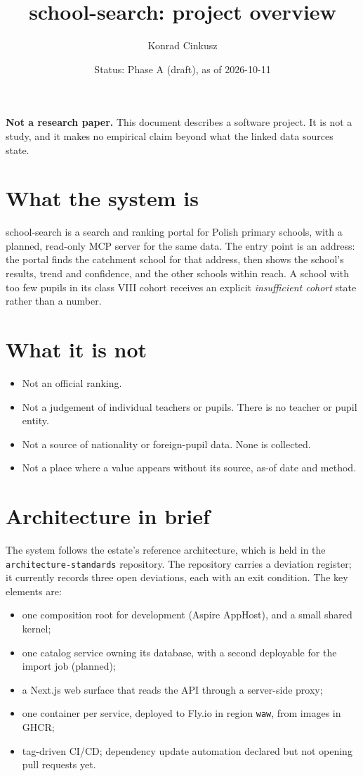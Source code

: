 \documentclass[11pt,a4paper]{article}
\title{school-search: project overview}
\author{Konrad Cinkusz}
\date{Status: Phase A (draft), as of 2026-10-11}
\begin{document}
\maketitle

\noindent\textbf{Not a research paper.} This document describes a software project. It is
not a study, and it makes no empirical claim beyond what the linked data sources state.

\section{What the system is}

school-search is a search and ranking portal for Polish primary schools, with a planned,
read-only MCP server for the same data. The entry point is an address: the portal finds the
catchment school for that address, then shows the school's results, trend and confidence, and
the other schools within reach. A school with too few pupils in its class VIII cohort receives an
explicit \emph{insufficient cohort} state rather than a number.

\section{What it is not}

\begin{itemize}[leftmargin=*]
  \item Not an official ranking.
  \item Not a judgement of individual teachers or pupils. There is no teacher or pupil entity.
  \item Not a source of nationality or foreign-pupil data. None is collected.
  \item Not a place where a value appears without its source, as-of date and method.
\end{itemize}

\section{Architecture in brief}

The system follows the estate's reference architecture, which is held in the
\texttt{architecture-standards} repository. The repository carries a deviation register; it
currently records three open deviations, each with an exit condition. The key elements are:

\begin{itemize}[leftmargin=*]
  \item one composition root for development (Aspire AppHost), and a small shared kernel;
  \item one catalog service owning its database, with a second deployable for the import job (planned);
  \item a Next.js web surface that reads the API through a server-side proxy;
  \item one container per service, deployed to Fly.io in region \texttt{waw}, from images in GHCR;
  \item tag-driven CI/CD; dependency update automation declared but not opening pull requests yet.
\end{itemize}
\end{document}
